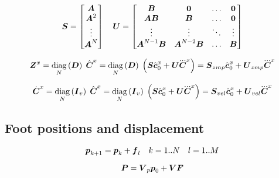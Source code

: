 \begin{equation*}
    \mbox{\boldmath $S$} =
        \begin{bmatrix}
        \mbox{\boldmath $A$} \\
        \mbox{\boldmath $A$}^2 \\
        \vdots \\
        \mbox{\boldmath $A$}^{N}\\
        \end{bmatrix}
    \quad
    \mbox{\boldmath $U$} =
        \begin{bmatrix}
        \mbox{\boldmath $B$}               & \mbox{\boldmath $0$}             & \dots & \mbox{\boldmath $0$} \\
        \mbox{\boldmath $A$}\mbox{\boldmath $B$}          & \mbox{\boldmath $B$}             & \dots & \mbox{\boldmath $0$} \\
        \vdots              & \vdots            & \ddots& \vdots \\
        \mbox{\boldmath $A$}^{N-1}\mbox{\boldmath $B$}    & \mbox{\boldmath $A$}^{N-2}\mbox{\boldmath $B$}  & \dots & \mbox{\boldmath $B$} \\
        \end{bmatrix}
\end{equation*}

\begin{equation*}
    \ZMP^x = 
        \diag{N}{\M{D}} \cState^x = 
        \diag{N}{\M{D}} \left(\M{S} \cstate_0^x  +  \M{U} \cJerk^x \right) = 
        \M{S}_{zmp} \cstate_0^x + \M{U}_{zmp} \cJerk^x
\end{equation*}

\begin{equation*}
    \cVel^x = 
        \diag{N}{\M{I}_{v}} \cState^x = 
        \diag{N}{\M{I}_{v}} \left(\M{S} \cstate_0^x  +  \M{U} \cJerk^x \right) = 
        \M{S}_{vel} \cstate_0^x + \M{U}_{vel} \cJerk^x
\end{equation*}


\subsection{Foot positions and displacement}
\begin{equation*}
    \mbox{\boldmath $p$}_{k+1} = \mbox{\boldmath $p$}_k + \mbox{\boldmath $f$}_{l}
    \quad
    k = 1..N
    \quad
    l = 1..M
\end{equation*}

\begin{equation*}
    \mbox{\boldmath $P$} = \mbox{\boldmath $V$}_p \mbox{\boldmath $p$}_0 + \mbox{\boldmath $V$} \mbox{\boldmath $F$}
\end{equation*}


